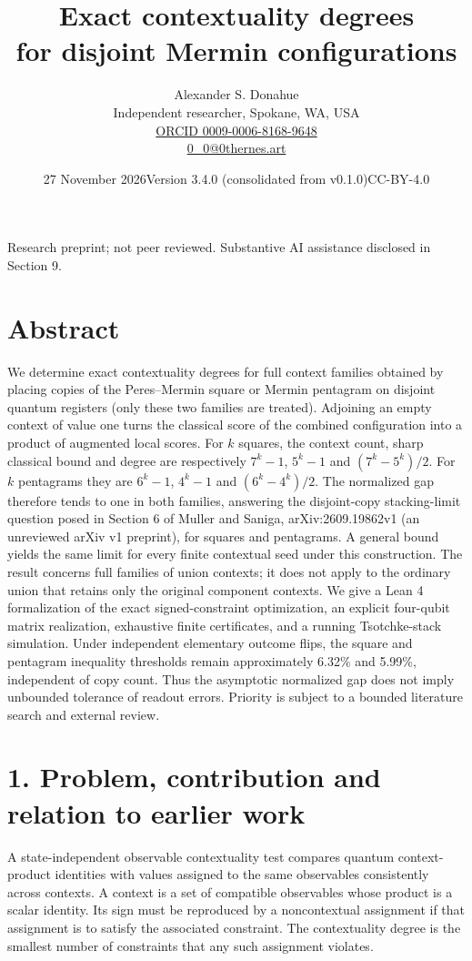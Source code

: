 \documentclass[10pt,a4paper]{article}
\title{\vspace{-12mm}\sffamily\bfseries Exact contextuality degrees\\for disjoint Mermin configurations}
\author{Alexander S. Donahue\\\small Independent researcher, Spokane, WA, USA\\\small\href{https://orcid.org/0009-0006-8168-9648}{ORCID 0009-0006-8168-9648}\\\small\href{mailto:0_0@0thernes.art}{0\_0@0thernes.art}}
\date{27 November 2026\quad\textbullet\quad Version 3.4.0 (consolidated from v0.1.0)\quad\textbullet\quad CC-BY-4.0}
\begin{document}
\maketitle
\begin{center}\small Research preprint; not peer reviewed. Substantive AI assistance disclosed in Section 9.\end{center}
\section{Abstract}\label{abstract}

We determine exact contextuality degrees for full context families obtained by placing copies of the Peres--Mermin square or Mermin pentagram on disjoint quantum registers (only these two families are treated). Adjoining an empty context of value one turns the classical score of the combined configuration into a product of augmented local scores. For \(k\) squares, the context count, sharp classical bound and degree are respectively \(7^k-1\), \(5^k-1\) and \((7^k-5^k)/2\). For \(k\) pentagrams they are \(6^k-1\), \(4^k-1\) and \((6^k-4^k)/2\). The normalized gap therefore tends to one in both families, answering the disjoint-copy stacking-limit question posed in Section 6 of Muller and Saniga, arXiv:2609.19862v1 (an unreviewed arXiv v1 preprint), for squares and pentagrams. A general bound yields the same limit for every finite contextual seed under this construction. The result concerns full families of union contexts; it does not apply to the ordinary union that retains only the original component contexts. We give a Lean 4 formalization of the exact signed-constraint optimization, an explicit four-qubit matrix realization, exhaustive finite certificates, and a running Tsotchke-stack simulation. Under independent elementary outcome flips, the square and pentagram inequality thresholds remain approximately 6.32\% and 5.99\%, independent of copy count. Thus the asymptotic normalized gap does not imply unbounded tolerance of readout errors. Priority is subject to a bounded literature search and external review.

\section{1. Problem, contribution and relation to earlier work}\label{problem-contribution-and-relation-to-earlier-work}

A state-independent observable contextuality test compares quantum context-product identities with values assigned to the same observables consistently across contexts. A context is a set of compatible observables whose product is a scalar identity. Its sign must be reproduced by a noncontextual assignment if that assignment is to satisfy the associated constraint. The contextuality degree is the smallest number of constraints that any such assignment violates.
\end{document}
